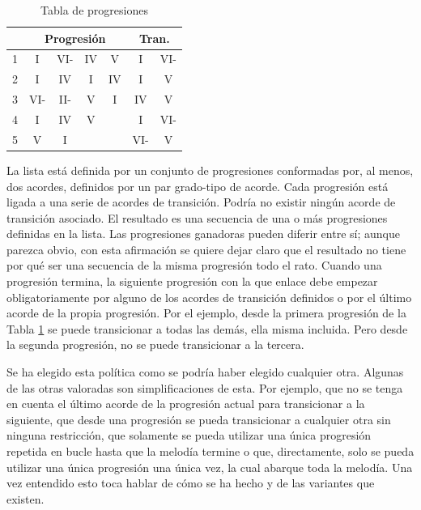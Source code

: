 \begin{table}[h]
    \centering
    \begin{tabular}{c||c|c|c|c||c|c|c|c}
        \multicolumn{1}{c}{\textbf{}} & \multicolumn{4}{c||}{\textbf{Progresión}} & \multicolumn{4}{c}{\textbf{Tran.}} \\
        \hline
        1 & I & VI- & IV & V & \multicolumn{2}{c|}{I} & \multicolumn{2}{c}{VI-} \\
        \hline       
        2 & I & IV & I & IV & \multicolumn{2}{c|}{I} & \multicolumn{2}{c}{V} \\
        \hline
        3 & VI- & II- & V & I & \multicolumn{2}{c|}{IV} & \multicolumn{2}{c}{V} \\
        \hline 
        4 & I & IV & \multicolumn{1}{c}{V} & & \multicolumn{2}{c|}{I} & \multicolumn{2}{c}{VI-} \\
        \hline 
        5 & V & \multicolumn{1}{c}{I} & \multicolumn{1}{c}{} & & \multicolumn{2}{c|}{VI-} & \multicolumn{2}{c}{V} \\

        
    \end{tabular}
    \caption{Tabla de progresiones}
    \label{tab:progresiones}
\end{table}

La lista está definida por un conjunto de progresiones conformadas por, al menos, dos acordes, definidos por un par grado-tipo de acorde. Cada progresión está ligada a una serie de acordes de transición. Podría no existir ningún acorde de transición asociado. El resultado es una secuencia de una o más progresiones definidas en la lista. Las progresiones ganadoras pueden diferir entre sí; aunque parezca obvio, con esta afirmación se quiere dejar claro que el resultado no tiene por qué ser una secuencia de la misma progresión todo el rato. Cuando una progresión termina, la siguiente progresión con la que enlace debe empezar obligatoriamente por alguno de los acordes de transición definidos o por el último acorde de la propia progresión. Por el ejemplo, desde la primera progresión de la Tabla \ref{tab:progresiones} se puede transicionar a todas las demás, ella misma incluida. Pero desde la segunda progresión, no se puede transicionar a la tercera. 

Se ha elegido esta política como se podría haber elegido cualquier otra. Algunas de las otras valoradas son simplificaciones de esta. Por ejemplo, que no se tenga en cuenta el último acorde de la progresión actual para transicionar a la siguiente, que desde una progresión se pueda transicionar a cualquier otra sin ninguna restricción, que solamente se pueda utilizar una única progresión repetida en bucle hasta que la melodía termine o que, directamente, solo se pueda utilizar una única progresión una única vez, la cual abarque toda la melodía. Una vez entendido esto toca hablar de cómo se ha hecho y de las variantes que existen.

